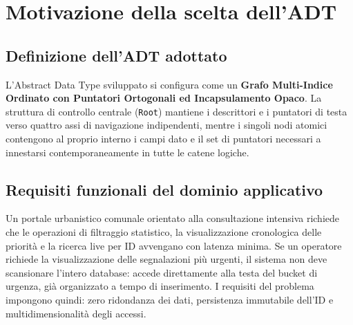 \documentclass[12pt, a4paper]{article}
\begin{document}
\section{Motivazione della scelta dell'ADT}

\subsection{Definizione dell'ADT adottato}
L'Abstract Data Type sviluppato si configura come un \textbf{Grafo Multi-Indice Ordinato con Puntatori Ortogonali ed Incapsulamento Opaco}. La struttura di controllo centrale (\texttt{Root}) mantiene i descrittori e i puntatori di testa verso quattro assi di navigazione indipendenti, mentre i singoli nodi atomici contengono al proprio interno i campi dato e il set di puntatori necessari a innestarsi contemporaneamente in tutte le catene logiche.

\subsection{Requisiti funzionali del dominio applicativo}
Un portale urbanistico comunale orientato alla consultazione intensiva richiede che le operazioni di filtraggio statistico, la visualizzazione cronologica delle priorità e la ricerca live per ID avvengano con latenza minima. Se un operatore richiede la visualizzazione delle segnalazioni più urgenti, il sistema non deve scansionare l'intero database: accede direttamente alla testa del bucket di urgenza, già organizzato a tempo di inserimento. I requisiti del problema impongono quindi: zero ridondanza dei dati, persistenza immutabile dell'ID e multidimensionalità degli accessi.
\end{document}
